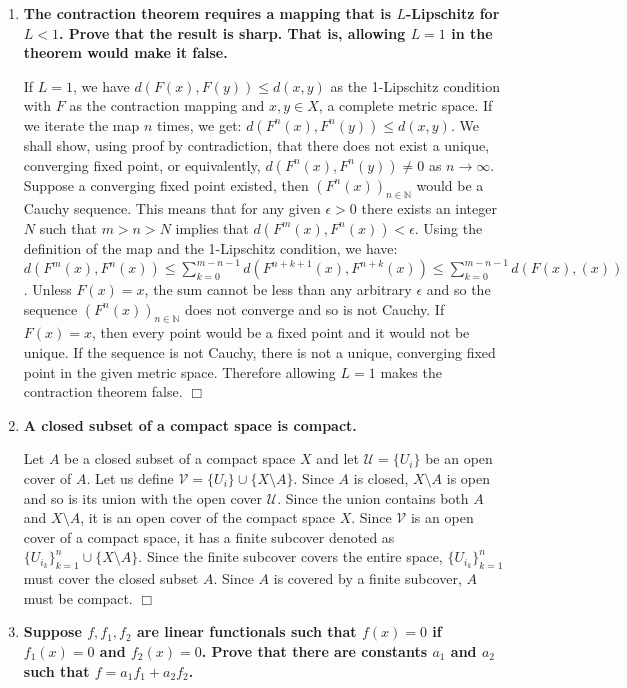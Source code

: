 \documentclass[5pt,letterpaper,reqno]{amsart}
\newcommand{\N}{\mathbb N}
\begin{document}
\begin{enumerate}[1.]
\item  \textbf{The contraction theorem requires a mapping that is $L$-Lipschitz for $L<1$. Prove that the result is sharp. That is, allowing $L=1$ in the theorem would make it false.}
\begin{flushleft}
    If $L=1$, we have $d(F(x),F(y)) \leq d(x,y)$ as the 1-Lipschitz condition with $F$ as the contraction mapping and $x,y \in X$, a complete metric space. If we iterate the map $n$ times, we get: $d(F^n(x),F^n(y)) \leq d(x,y)$. We shall show, using proof by contradiction, that there does not exist a unique, converging fixed point, or equivalently, $d(F^n(x),F^n(y)) \not= 0$ as $n \rightarrow \infty$. Suppose a converging fixed point existed, then $(F^n(x))_{n\in\N}$ would be a Cauchy sequence. This means that for any given $\epsilon > 0$ there exists an integer $N$ such that $m>n>N$ implies that $d(F^m(x),F^n(x)) < \epsilon$. Using the definition of the map and the 1-Lipschitz condition, we have: $d \left(F^{m}(x),F^{n}(x)\right) \leq \sum\limits_{k=0}^{m-n-1} d \left(F^{n+k+1}(x), F^{n+k}(x) \right) \leq \sum\limits_{k=0}^{m-n-1} d(F(x),(x))$. Unless $F(x) = x$, the sum cannot be less than any arbitrary $\epsilon$ and so the sequence $(F^n(x))_{n\in\N}$ does not converge and so is not Cauchy. If $F(x) = x$, then every point would be a fixed point and it would not be unique. If the sequence is not Cauchy, there is not a unique, converging fixed point in the given metric space. Therefore allowing $L=1$ makes the contraction theorem false. $\Box$
\end{flushleft}
\item \textbf{A closed subset of a compact space is compact.}
\begin{flushleft}
    Let $A$ be a closed subset of a compact space $X$ and let $\mathcal{U} = \{U_i\}$ be an open cover of $A$. Let us define $\mathcal{V} = \{U_i\} \cup \{X\setminus A\}$. Since $A$ is closed, $X\setminus A$ is open and so is its union with the open cover $\mathcal{U}$. Since the union contains both $A$ and $X\setminus A$, it is an open cover of the compact space $X$. Since $\mathcal{V}$ is an open cover of a compact space, it has a finite subcover denoted as $\{U_{i_k}\}_{k=1}^n \cup \{X\setminus A\}$. Since the finite subcover covers the entire space, $\{U_{i_k}\}_{k=1}^n$ must cover the closed subset $A$. Since $A$ is covered by a finite subcover, $A$ must be compact. $\Box$
\end{flushleft}
\item \textbf{Suppose $f, f_1, f_2$ are linear functionals such that $f(x)=0$ if $f_1(x)=0$ and $f_2(x)=0$. Prove that there are constants $a_1$ and $a_2$ such that $f=a_1 f_1+a_2f_2$.}

\end{enumerate}
\end{document}
